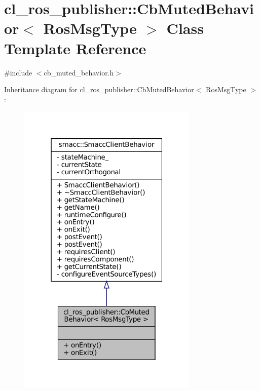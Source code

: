 \hypertarget{classcl__ros__publisher_1_1CbMutedBehavior}{}\section{cl\+\_\+ros\+\_\+publisher\+:\+:Cb\+Muted\+Behavior$<$ Ros\+Msg\+Type $>$ Class Template Reference}
\label{classcl__ros__publisher_1_1CbMutedBehavior}


{\ttfamily \#include $<$cb\+\_\+muted\+\_\+behavior.\+h$>$}



Inheritance diagram for cl\+\_\+ros\+\_\+publisher\+:\+:Cb\+Muted\+Behavior$<$ Ros\+Msg\+Type $>$\+:
\nopagebreak
\begin{figure}[H]
\begin{center}
\leavevmode
\includegraphics[width=244pt]{classcl__ros__publisher_1_1CbMutedBehavior__inherit__graph}
\end{center}
\end{figure}



